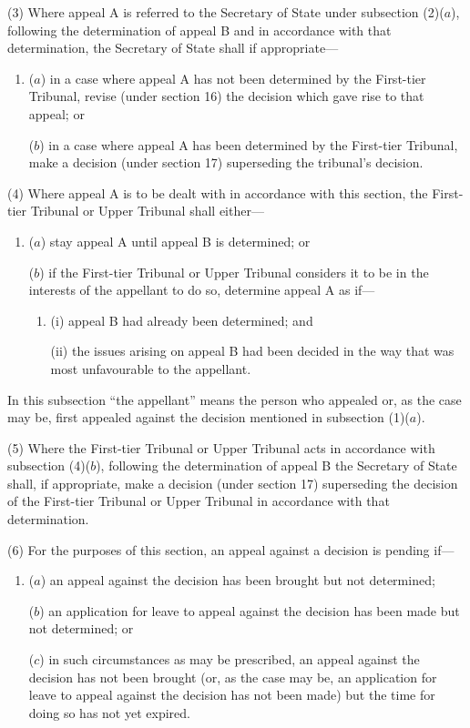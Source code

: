 \documentclass[12pt,a4paper]{article}
\begin{document}
(3) Where appeal A is referred to the Secretary of State under subsection (2)($a$), following the determination of appeal B and in accordance with that determination, the Secretary of State shall if appropriate---
\begin{enumerate}\item[]
($a$) in a case where appeal A has not been determined by the First-tier Tribunal, revise (under section 16) the decision which gave rise to that appeal; or

($b$) in a case where appeal A has been determined by the First-tier Tribunal, make a decision (under section 17) superseding the tribunal’s decision.
\end{enumerate}

(4) Where appeal A is to be dealt with in accordance with this section, the First-tier Tribunal or Upper Tribunal shall either---
\begin{enumerate}\item[]
($a$) stay appeal A until appeal B is determined; or

($b$) if the First-tier Tribunal or Upper Tribunal considers it to be in the interests of the appellant to do so, determine appeal A as if---
\begin{enumerate}\item[]
(i)
appeal B had already been determined; and

(ii)
the issues arising on appeal B had been decided in the way that was most unfavourable to the appellant.
\end{enumerate}
\end{enumerate}

In this subsection “the appellant” means the person who appealed or, as the case may
be, first appealed against the decision  mentioned in subsection (1)($a$).

(5) Where the First-tier Tribunal or Upper Tribunal acts in accordance with
subsection (4)($b$), following the determination of appeal B the Secretary of State
shall, if appropriate, make a decision (under section 17) superseding the decision of
the First-tier Tribunal or Upper Tribunal in accordance with that determination.

(6) For the purposes of this section, an appeal against a decision is pending if---
\begin{enumerate}\item[]
($a$) an appeal against the decision has been brought but not determined;

($b$) an application for leave to appeal against the decision has been made but
not determined; or

($c$) in such circumstances as may be prescribed, an appeal against the decision
has not been brought (or, as the case may be, an application for leave to
appeal against the decision has not been made) but the time for doing so has
not yet expired.
\end{enumerate}
\end{document}
